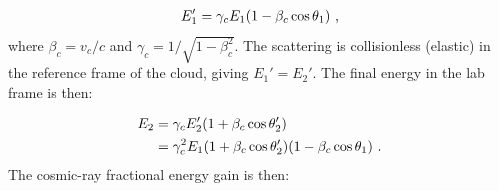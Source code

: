 \begin{equation}
    \begin{aligned}
        E_1'=\gamma_cE_1\qty(1-\beta_c\cos\theta_1)\text{ ,}
    \end{aligned}
\end{equation}
\noindent where $\beta_c=v_c/c$ and $\gamma_c=1/\sqrt{1-\beta_c^2}$. The scattering is collisionless (elastic) in the reference frame of the cloud, giving $E_1'=E_2'$. The final energy in the lab frame is then:

\begin{equation}
    \begin{aligned}
        E_2&=\gamma_c E_2'\qty(1+\beta_c\cos\theta_2') \\
        &=\gamma_c^2E_1\qty(1+\beta_c\cos\theta_2')\qty(1-\beta_c\cos\theta_1) \text{ .}
    \end{aligned}
\end{equation}
\noindent The cosmic-ray fractional energy gain is then:

